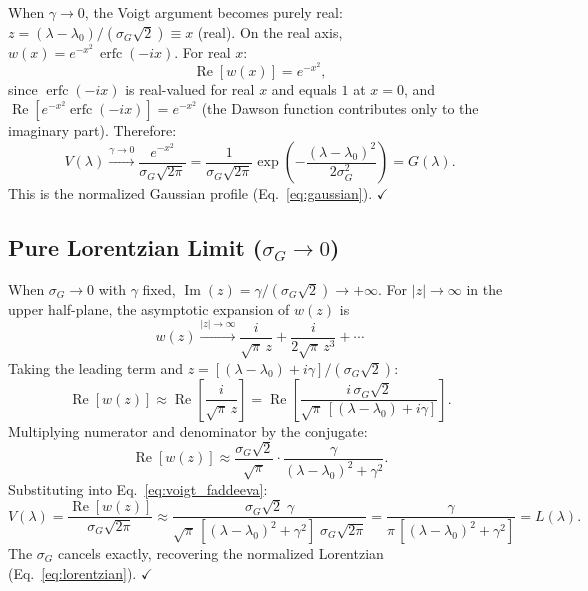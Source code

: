 \documentclass[11pt]{article}
\newcommand{\wfn}{w}  %
\newcommand{\re}{\operatorname{Re}}
\newcommand{\im}{\operatorname{Im}}
\newcommand{\erfc}{\operatorname{erfc}}
\begin{document}
When $\gamma \to 0$, the Voigt argument becomes purely real:
$z = (\lambda - \lambda_0)/(\sigma_G\sqrt{2}) \equiv x$ (real).
On the real axis, $\wfn(x) = e^{-x^2}\,\erfc(-ix)$. For real $x$:
\begin{equation}
  \re[\wfn(x)] = e^{-x^2},
  \label{eq:w_real_axis}
\end{equation}
since $\erfc(-ix)$ is real-valued for real $x$ and equals $1$ at $x=0$,
and $\re[e^{-x^2}\erfc(-ix)] = e^{-x^2}$ (the Dawson function contributes only
to the imaginary part). Therefore:
\begin{equation}
  V(\lambda) \xrightarrow{\gamma \to 0}
    \frac{e^{-x^2}}{\sigma_G\sqrt{2\pi}}
  = \frac{1}{\sigma_G\sqrt{2\pi}}\exp\!\left(-\frac{(\lambda - \lambda_0)^2}{2\sigma_G^2}\right)
  = G(\lambda).
  \label{eq:gaussian_limit}
\end{equation}
This is the normalized Gaussian profile (Eq.~\ref{eq:gaussian}). $\checkmark$


\subsection{Pure Lorentzian Limit ($\sigma_G \to 0$)}

When $\sigma_G \to 0$ with $\gamma$ fixed, $\im(z) = \gamma/(\sigma_G\sqrt{2}) \to +\infty$.
For $|z| \to \infty$ in the upper half-plane, the asymptotic expansion of $\wfn(z)$ is
\begin{equation}
  \wfn(z) \xrightarrow{|z|\to\infty} \frac{i}{\sqrt{\pi}\,z}
    + \frac{i}{2\sqrt{\pi}\,z^3} + \cdots
  \label{eq:w_asymptotic}
\end{equation}
Taking the leading term and $z = [(\lambda - \lambda_0) + i\gamma]/(\sigma_G\sqrt{2})$:
\begin{equation}
  \re[\wfn(z)] \approx \re\!\left[\frac{i}{\sqrt{\pi}\,z}\right]
  = \re\!\left[\frac{i\,\sigma_G\sqrt{2}}{\sqrt{\pi}\,[(\lambda-\lambda_0) + i\gamma]}\right].
  \label{eq:w_leading}
\end{equation}
Multiplying numerator and denominator by the conjugate:
\begin{equation}
  \re[\wfn(z)] \approx \frac{\sigma_G\sqrt{2}}{\sqrt{\pi}}
    \cdot \frac{\gamma}{(\lambda-\lambda_0)^2 + \gamma^2}.
  \label{eq:w_lorentzian}
\end{equation}
Substituting into Eq.~\eqref{eq:voigt_faddeeva}:
\begin{equation}
  V(\lambda) = \frac{\re[\wfn(z)]}{\sigma_G\sqrt{2\pi}}
  \approx \frac{\sigma_G\sqrt{2}\;\gamma}
       {\sqrt{\pi}\,[(\lambda-\lambda_0)^2+\gamma^2]\;\sigma_G\sqrt{2\pi}}
  = \frac{\gamma}{\pi\,[(\lambda-\lambda_0)^2+\gamma^2]}
  = L(\lambda).
  \label{eq:lorentzian_limit}
\end{equation}
The $\sigma_G$ cancels exactly, recovering the normalized Lorentzian (Eq.~\ref{eq:lorentzian}). $\checkmark$
\end{document}
